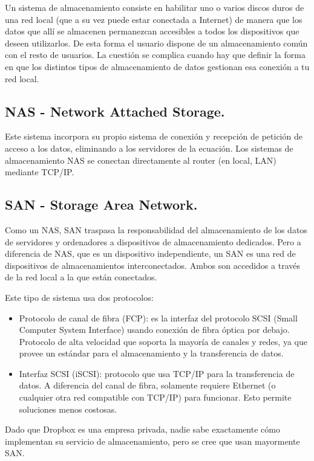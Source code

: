 Un sistema de almacenamiento consiste en habilitar uno o varios discos duros de una red local (que a su vez puede estar conectada a Internet) de manera que los datos que allí se almacenen permanezcan accesibles a todos los dispositivos que deseen utilizarlos. De esta forma el usuario dispone de un almacenamiento común con el resto de usuarios.
La cuestión se complica cuando hay que definir la forma en que los distintos tipos de almacenamiento de datos gestionan esa conexión a tu red local.

\subsection{NAS - Network Attached Storage.}

Este sistema incorpora su propio sistema de conexión y recepción de petición de acceso a los datos, eliminando a los servidores de la ecuación. Los sistemas de almacenamiento NAS se conectan directamente al router (en local, LAN) mediante TCP/IP.

\subsection{SAN - Storage Area Network.}


Como un NAS, SAN traspasa la responsabilidad del almacenamiento de los datos de servidores y ordenadores a dispositivos de almacenamiento dedicados. Pero a diferencia de NAS, que es un dispositivo independiente, un SAN es una red de dispositivos de almacenamientos interconectados. Ambos son accedidos a través de la red local a la que están conectados.

Este tipo de sistema usa dos protocolos:
\begin{itemize}
\item Protocolo de canal de fibra (FCP): es la interfaz del protocolo SCSI (Small Computer System Interface) usando conexión de fibra óptica por debajo. Protocolo de alta velocidad que soporta la mayoría de canales y redes, ya que provee un estándar para el almacenamiento y la transferencia de datos.
\item Interfaz SCSI (iSCSI): protocolo que usa TCP/IP para la transferencia de datos. A diferencia del canal de fibra, solamente requiere Ethernet (o cualquier otra red compatible con TCP/IP) para funcionar. Esto permite soluciones menos costosas.
\end{itemize}

Dado que Dropbox es una empresa privada, nadie sabe exactamente cómo implementan su servicio de almacenamiento, pero se cree que usan mayormente SAN.

